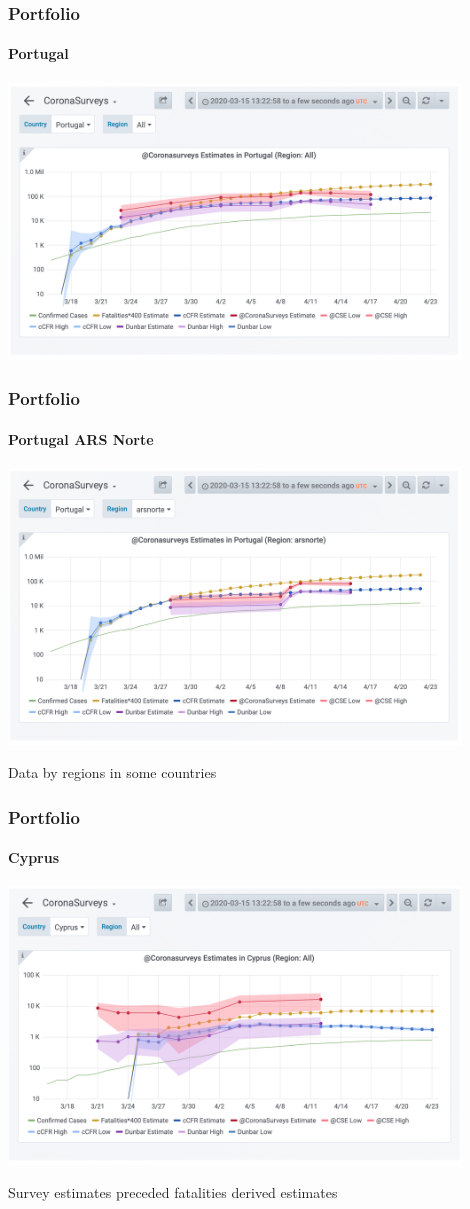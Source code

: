 \documentclass{beamer}
\begin{document}
\begin{frame}
  \frametitle{Portfolio}
  \framesubtitle{Portugal}
  \begin{center}
  \includegraphics[width=0.9\textwidth]{Portugal.png}
  \end{center}
\end{frame}

\begin{frame}
  \frametitle{Portfolio}
  \framesubtitle{Portugal ARS Norte}
  \begin{center}
  \includegraphics[width=0.9\textwidth]{PortugalNorte.png}
  \end{center}
  Data by regions in some countries
\end{frame}

\begin{frame}
  \frametitle{Portfolio}
  \framesubtitle{Cyprus}
  \begin{center}
  \includegraphics[width=0.9\textwidth]{Cyprus.png}
  \end{center}
  Survey estimates preceded fatalities derived estimates
\end{frame}
\end{document}
